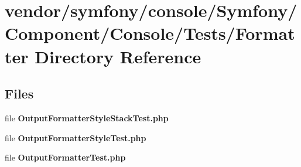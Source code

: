 \section{vendor/symfony/console/\+Symfony/\+Component/\+Console/\+Tests/\+Formatter Directory Reference}
\label{dir_24cc9a4365279709521fa9026be13290}
\subsection*{Files}
\begin{DoxyCompactItemize}
\item 
file {\bf Output\+Formatter\+Style\+Stack\+Test.\+php}
\item 
file {\bf Output\+Formatter\+Style\+Test.\+php}
\item 
file {\bf Output\+Formatter\+Test.\+php}
\end{DoxyCompactItemize}
